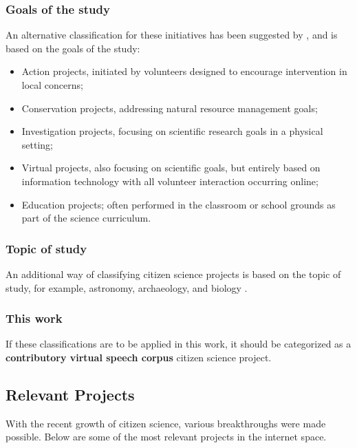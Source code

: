 \subsubsection{Goals of the study}

An alternative classification for these initiatives has been suggested by \cite{wiggins2011conservation}, and is based on the goals of the study:

\begin{itemize}
    \item Action projects, initiated by volunteers designed to encourage intervention in local concerns;
    \item Conservation projects, addressing natural resource management goals;
    \item Investigation projects, focusing on scientific research goals in a physical setting;
    \item Virtual projects, also focusing on scientific goals, but entirely based on information technology with all volunteer interaction occurring online;
    \item Education projects; often performed in the classroom or school grounds as part of the science curriculum.
\end{itemize}

\subsubsection{Topic of study}

An additional way of classifying citizen science projects is based on the topic of study, for example, astronomy, archaeology, and biology \cite{wiggins2011conservation}. 

\subsubsection{This work}

If these classifications are to be applied in this work, it should be categorized as a \textbf{contributory virtual speech corpus} citizen science project.

\subsection{Relevant Projects}

With the recent growth of citizen science, various breakthroughs were made possible. Below are some of the most relevant projects in the internet space.

